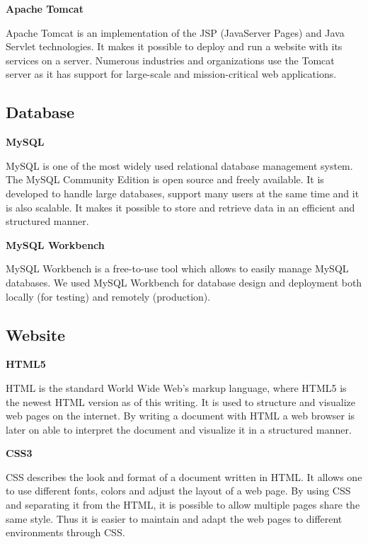 \textbf{Apache Tomcat} \nocite{ApacheTomcat}

Apache Tomcat is an implementation of the JSP (JavaServer Pages) and Java Servlet technologies.
It makes it possible to deploy and run a website with its services on a server.
Numerous industries and organizations use the Tomcat server as it has support for large-scale and mission-critical web applications.

\subsection{Database}

\textbf{MySQL} \nocite{MySQL}

MySQL is one of the most widely used relational database management system.
The MySQL Community Edition is open source and freely available.
It is developed to handle large databases, support many users at the same time and it is also scalable.
It makes it possible to store and retrieve data in an efficient and structured manner.

\textbf{MySQL Workbench}

MySQL Workbench is a free-to-use tool which allows to easily manage MySQL databases.
We used MySQL Workbench for database design and deployment both locally (for testing) and remotely (production).


\subsection{Website}

\textbf{HTML5} \nocite{HTML5}

HTML is the standard World Wide Web's markup language, where HTML5 is the newest HTML version as of this writing.
It is used to structure and visualize web pages on the internet.
By writing a document with HTML a web browser is later on able to interpret the document and visualize it in a structured manner.

\textbf{CSS3} \nocite{CSS3}

CSS describes the look and format of a document written in HTML.
It allows one to use different fonts, colors and adjust the layout of a web page.
By using CSS and separating it from the HTML, it is possible to allow multiple pages share the same style.
Thus it is easier to maintain and adapt the web pages to different environments through CSS.

